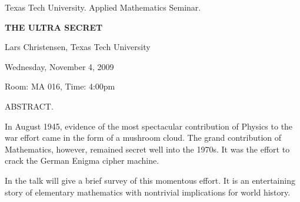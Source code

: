 \documentclass[oneside]{amsart}
\newcommand{\talktitle}{\uppercase{The Ultra Secret}}
\newcommand{\talkspeaker}{Lars Christensen, Texas Tech University}
\newcommand{\talkdate}{Wednesday, November 4, 2009}
\newcommand{\talkabstract}{
In August 1945, evidence of the most spectacular
contribution of Physics to the war effort came in the form of a
mushroom cloud. The grand contribution of Mathematics, however,
remained secret well into the 1970s. It was the effort to crack the
German Enigma cipher machine.

In the talk will give a brief survey of this momentous effort. It is
an entertaining story of elementary mathematics with nontrivial
implications for world history.
}
\begin{document}
\thispagestyle{empty}

\begin{center}
Texas Tech University.  Applied Mathematics Seminar.

\end{center}

\begin{center}

\textbf{\LARGE \talktitle}

\talkspeaker

\talkdate

Room: MA 016, Time: 4:00pm

\end{center}

ABSTRACT.
\talkabstract
\end{document}
